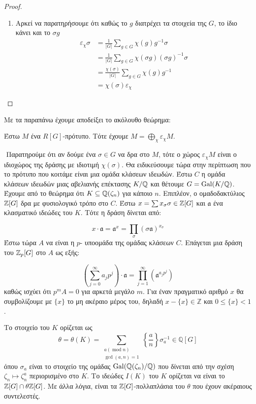 \begin{proof}
\begin{enumerate}
\item Αρκεί να παρατηρήσουμε ότι καθώς το $g$ διατρέχει τα στοιχεία της $G$, το ίδιο κάνει και το $\sigma g$
\begin{align*} \varepsilon_\chi \sigma &= \frac{1}{|G|} \sum\limits_{g \in G} \chi(g)g^{-1}\sigma \\
	&= \frac{1}{|G|} \sum\limits_{g \in G} \chi(\sigma g)(\sigma g)^{-1}\sigma \\
	&= \frac{\chi(\sigma)}{|G|} \sum\limits_{g \in G} \chi(g)g^{-1} \\
	&= \chi(\sigma) \varepsilon_{\chi}
\end{align*}
\end{enumerate}
\end{proof}


\noindent Με τα παραπάνω έχουμε αποδείξει το ακόλουθο θεώρημα:

\begin{theorem}
	Έστω $M$ ένα $R[G]$-πρότυπο. Τότε έχουμε $M=\bigoplus_{\chi} \varepsilon_\chi M$.
\end{theorem}

$ $\newline
Παρατηρούμε ότι αν δούμε ένα $\sigma \in G$ να δρα στο $M$, τότε ο χώρος $\varepsilon_{\chi}M$ είναι ο ιδιοχώρος της δράσης με ιδιοτιμή $\chi(\sigma)$.
Θα ειδικεύσουμε τώρα στην περίπτωση που το πρότυπο που κοιτάμε είναι μια ομάδα κλάσεων ιδεωδών. Έστω $C$ η ομάδα κλάσεων ιδεωδών μιας 
αβελιανής επέκτασης $K/\mathbb{Q}$ και θέτουμε $G=\operatorname{Gal}(K/\mathbb{Q})$. Έχουμε από το θεώρημα  ότι $K\subseteq \mathbb{Q}(\zeta_n)$ 
για κάποιο $n$. Επιπλέον, ο ομαδοδακτύλιος $\mathbb{Z}[G]$ δρα με φυσιολογικό τρόπο στο $C$. Έστω $x = \sum x_{\sigma}\sigma \in \mathbb{Z}[G]$ και $\mathfrak{a}$ ένα κλασματικό ιδεώδες του $K$. Τότε η δράση δίνεται από:

$$x \cdot \mathfrak{a} = \mathfrak{a}^x = \prod\limits_{\sigma} (\sigma \mathfrak{a})^{x_\sigma}$$ Έστω τώρα $A$ να είναι η $p$- υποομάδα της ομάδας κλάσεων $C$. Επάγεται μια δράση του $\mathbb{Z}_p[G]$ στο $A$ ως εξής:

$$\left( \sum\limits_{j=0}^\infty a_j p^j \right) \cdot \mathfrak{a} = \prod\limits_{j=1}^\infty (\mathfrak{a}^{a_jp^j})$$ καθώς ισχύει ότι $p^m A = 0$ για αρκετά μεγάλο $m$. Για έναν πραγματικό αριθμό $x$ θα συμβολίζουμε με $\{x\}$ το μη ακέραιο μέρος του, δηλαδή $x-\{x\} \in \mathbb{Z}$ και $0\leq \{x\} < 1$.

\begin{defn}
	Το στοιχείο  του $K$ ορίζεται ως
	$$\theta = \theta(K) = \sum\limits_{\substack{a(\operatorname{mod}n) \\ \gcd(a,n)=1 }} \left\{\frac{a}{n}\right\} \sigma_a^{-1} \in \mathbb{Q}[G]$$ όπου $\sigma_a$ είναι το στοιχείο της ομάδας $\operatorname{Gal}(\mathbb{Q}(\zeta_n)/\mathbb{Q})$ που δίνεται από την σχέση $\zeta_n \mapsto \zeta_n^a$ περιορισμένο στο $K$. Το ιδεώδες  $I(K)$ του $K$ ορίζεται να είναι το $\mathbb{Z}[G]\cap \theta \mathbb{Z}[G]$. Με άλλα λόγια, είναι τα $\mathbb{Z}[G]$-πολλαπλάσια του $\theta$ που έχουν ακέραιους συντελεστές.
\end{defn}

